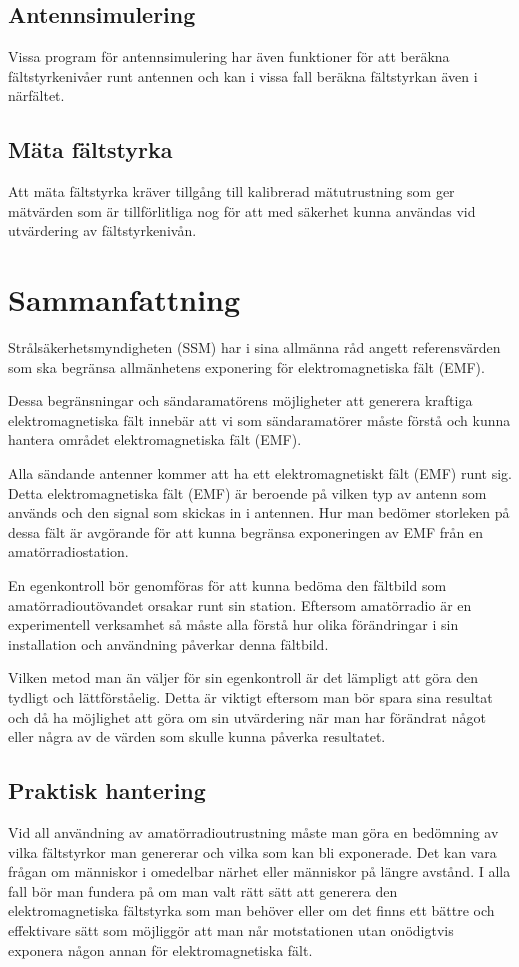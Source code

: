 \subsection{Antennsimulering}
Vissa program för antennsimulering har även funktioner för att beräkna
fältstyrkenivåer runt antennen och kan i vissa fall beräkna fältstyrkan
även i närfältet.

\subsection{Mäta fältstyrka}
Att mäta fältstyrka kräver tillgång till kalibrerad mätutrustning som
ger mätvärden som är tillförlitliga nog för att med säkerhet kunna användas
vid utvärdering av fältstyrkenivån.

\section{Sammanfattning}
Strålsäkerhetsmyndigheten (SSM) har i sina allmänna råd angett referensvärden
som ska begränsa allmänhetens exponering för elektromagnetiska fält (EMF).

Dessa begränsningar och sändaramatörens möjligheter att generera kraftiga
elektromagnetiska fält innebär att vi som sändaramatörer måste förstå
och kunna hantera området elektromagnetiska fält (EMF).

Alla sändande antenner kommer att ha ett elektromagnetiskt fält (EMF)
runt sig.
Detta elektromagnetiska fält (EMF) är beroende på vilken typ av antenn som
används och den signal som skickas in i antennen.
Hur man bedömer storleken på dessa fält är avgörande för att kunna
begränsa exponeringen av EMF från en amatörradiostation.

En egenkontroll bör genomföras för att kunna bedöma den fältbild som
amatörradioutövandet orsakar runt sin station.
Eftersom amatörradio är en experimentell verksamhet så måste alla förstå hur
olika förändringar i sin installation och användning påverkar denna fältbild.

Vilken metod man än väljer för sin egenkontroll är det lämpligt att
göra den tydligt och lättförståelig.
Detta är viktigt eftersom man bör spara sina resultat och då ha möjlighet att
göra om sin utvärdering när man har förändrat något eller några av de värden
som skulle kunna påverka resultatet.

\subsection{Praktisk hantering}
Vid all användning av amatörradioutrustning måste man göra en bedömning
av vilka fältstyrkor man genererar och vilka som kan bli exponerade.
Det kan vara frågan om människor i omedelbar närhet eller människor på
längre avstånd.
I alla fall bör man fundera på om man valt rätt sätt att generera den
elektromagnetiska fältstyrka som man behöver eller om det finns ett bättre
och effektivare sätt som möjliggör att man når motstationen utan onödigtvis
exponera någon annan för elektromagnetiska fält.

